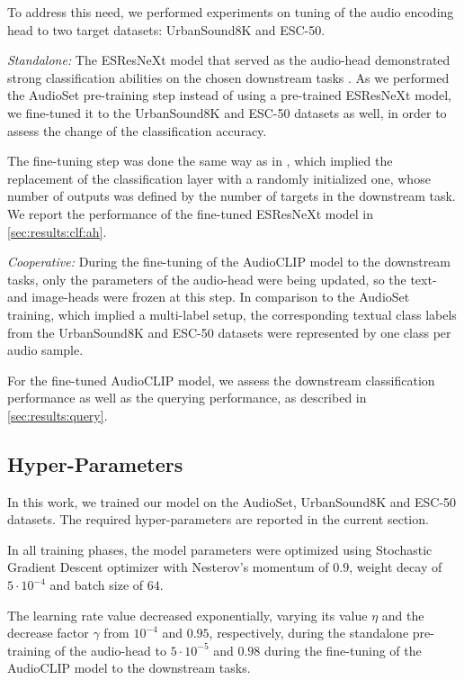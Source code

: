 \documentclass[runningheads]{llncs}
\begin{document}
To address this need, we performed experiments on tuning of the audio encoding head to two target datasets: \mbox{UrbanSound8K} and \mbox{ESC-50}.

\emph{Standalone:} The \mbox{ESResNeXt} model that served as the audio-head demonstrated strong classification abilities on the chosen downstream tasks \cite{guzhov2021esrnx}.
As we performed the \mbox{AudioSet} pre-training step instead of using a pre-trained \mbox{ESResNeXt} model, we fine-tuned it to the \mbox{UrbanSound8K} and \mbox{ESC-50} datasets as well, in order to assess the change of the classification accuracy.

The fine-tuning step was done the same way as in \cite{guzhov2021esrnx}, which implied the replacement of the classification layer with a randomly initialized one, whose number of outputs was defined by the number of targets in the downstream task.
We report the performance of the fine-tuned \mbox{ESResNeXt} model in \autoref{sec:results:clf:ah}.

\emph{Cooperative:} During the fine-tuning of the \mbox{AudioCLIP} model to the downstream tasks, only the parameters of the audio-head were being updated, so the text- and image-heads were frozen at this step.
In comparison to the \mbox{AudioSet} training, which implied a multi-label setup, the corresponding textual class labels from the \mbox{UrbanSound8K} and \mbox{ESC-50} datasets were represented by one class per audio sample.

For the fine-tuned \mbox{AudioCLIP} model, we assess the downstream classification performance as well as the querying performance, as described in \autoref{sec:results:query}.

\subsection{Hyper-Parameters} \label{sec:exp_setup:hparams}
In this work, we trained our model on the \mbox{AudioSet}, \mbox{UrbanSound8K} and \mbox{ESC-50} datasets.
The required hyper-parameters are reported in the current section.

In all training phases, the model parameters were optimized using Stochastic Gradient Descent \cite{polyak1992sgd} optimizer with Nesterov's momentum \cite{nesterov1983momentum} of $0.9$, weight decay of $5 \cdot 10^{-4}$ and batch size of $64$.

The learning rate value decreased exponentially, varying its value $\eta$ and the decrease factor $\gamma$ from $10^{-4}$ and $0.95$, respectively, during the standalone pre-training of the audio-head to $5 \cdot 10^{-5}$ and $0.98$ during the fine-tuning of the \mbox{AudioCLIP} model to the downstream tasks.
\end{document}
